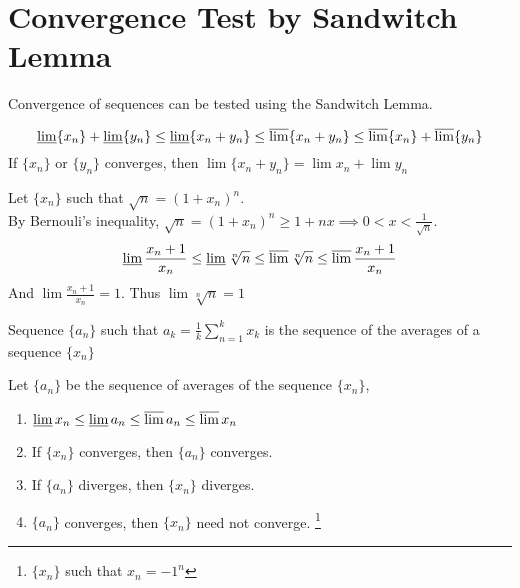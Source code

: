 \section{Convergence Test by Sandwitch Lemma}
	Convergence of sequences can be tested using the Sandwitch Lemma.	
	\begin{remark}
		$$\varliminf \{ x_n \} + \varliminf \{ y_n \} \le \varliminf \{ x_n + y_n \} \le \varlimsup \{ x_n + y_n \} \le \varlimsup \{ x_n \} + \varlimsup \{ y_n \}$$
		If $\{ x_n \}$ or $\{ y_n \}$ converges, then $\lim \{ x_n + y_n \} = \lim x_n + \lim y_n$
	\end{remark}
	\begin{remark}
		Let $\{ x_n \}$ such that  $\sqrt{n} = (1+x_n)^n$.\\
		By Bernouli's inequality, $\sqrt{n} = (1+x_n)^n \ge 1+nx \implies 0<x<\frac{1}{\sqrt{n}}$.
		$$\varliminf \frac{x_n+1}{x_n} \le \varliminf \sqrt[n]{n} \le \varlimsup \sqrt[n]{n} \le \varlimsup \frac{x_n+1}{x_n}$$
		And $\lim \frac{x_n+1}{x_n} = 1$. Thus $\lim\sqrt[n]{n} = 1$
	\end{remark}
	\begin{definition}
		Sequence $\{ a_n \}$ such that $a_k = \frac{1}{k} \sum_{n=1}^k x_k$ is the sequence of the averages of a sequence $\{ x_n \}$ 
	\end{definition}
	\begin{remark}Let $\{ a_n \}$ be the sequence of averages of the sequence $\{ x_n \}$,
		\begin{enumerate}	
		 	\item $\varliminf x_n \le \varliminf a_n \le \varlimsup a_n \le \varlimsup x_n$
			\item If $\{ x_n \}$ converges, then $\{ a_n \}$ converges.
			\item If $\{ a_n \}$ diverges, then $\{ x_n \}$ diverges.
			\item $\{ a_n \}$ converges, then $\{ x_n \}$ need not converge. \footnote{ $\{ x_n \}$ such that $x_n = -1^n$}
		\end{enumerate}
	\end{remark}
